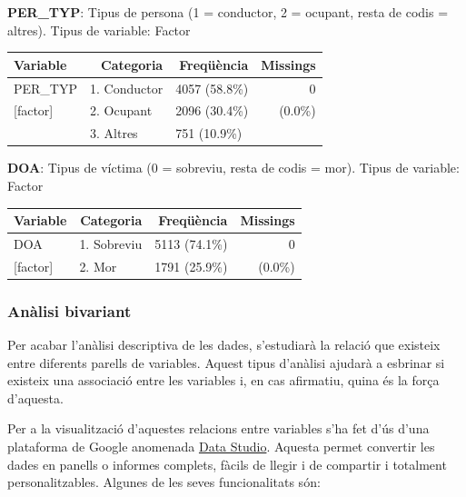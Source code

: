 \documentclass[11pt,longbibliography]{article}
\theoremstyle{definition}
\theoremstyle{remark}
\begin{document}
\textbf{PER\_TYP}: Tipus de persona (1 = conductor, 2 = ocupant, resta de codis = altres). Tipus de variable: Factor


\begin{table}[H]
\centering
\begin{tabular}{llll}
\hline
Variable & \multicolumn{1}{r}{Categoria} & \multicolumn{1}{r}{Freqüència} & \multicolumn{1}{r}{Missings} \\ \hline
PER\_TYP    & 1. Conductor  & 4057 (58.8\%) & \multicolumn{1}{r}{0} \\
{[}factor{]}      & 2. Ocupant  & 2096 (30.4\%) & \multicolumn{1}{r}{(0.0\%)} \\
                     & 3. Altres   & 751 (10.9\%) & \multicolumn{1}{r}{}          \\\hline
\end{tabular}
\end{table}


\textbf{DOA}: Tipus de víctima (0 = sobreviu, resta de codis = mor). Tipus de variable: Factor


\begin{table}[H]
\centering
\begin{tabular}{llll}
\hline
Variable & \multicolumn{1}{r}{Categoria} & \multicolumn{1}{r}{Freqüència} & \multicolumn{1}{r}{Missings} \\ \hline
DOA    & 1. Sobreviu  & 5113 (74.1\%) & \multicolumn{1}{r}{0} \\
{[}factor{]} & 2. Mor   & 1791 (25.9\%) & \multicolumn{1}{r}{(0.0\%)}          \\\hline
\end{tabular}
\end{table}

\subsubsection{Anàlisi bivariant}


Per acabar l'anàlisi descriptiva de les dades, s'estudiarà la relació que existeix entre diferents parells de variables. Aquest tipus d'anàlisi ajudarà a esbrinar si existeix una associació entre les variables i, en cas afirmatiu, quina és la força d'aquesta.


Per a la visualització d'aquestes relacions entre variables s'ha fet d'ús d'una plataforma de Google anomenada \href{https://datastudio.google.com/overview}{Data Studio}. Aquesta permet convertir les dades en panells o informes complets, fàcils de llegir i de compartir i totalment personalitzables. Algunes de les seves funcionalitats són:
\end{document}
